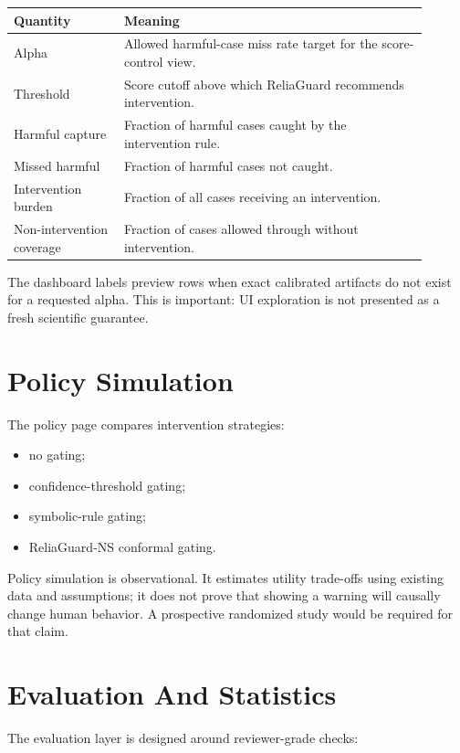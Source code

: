 \documentclass[11pt]{article}
\newcommand{\model}{ReliaGuard-NS}
\begin{document}
\begin{longtable}{p{0.24\linewidth} p{0.66\linewidth}}
\toprule
\textbf{Quantity} & \textbf{Meaning} \\
\midrule
Alpha & Allowed harmful-case miss rate target for the score-control view. \\
Threshold & Score cutoff above which ReliaGuard recommends intervention. \\
Harmful capture & Fraction of harmful cases caught by the intervention rule. \\
Missed harmful & Fraction of harmful cases not caught. \\
Intervention burden & Fraction of all cases receiving an intervention. \\
Non-intervention coverage & Fraction of cases allowed through without intervention. \\
\bottomrule
\end{longtable}

The dashboard labels preview rows when exact calibrated artifacts do not exist for a requested alpha. This is important: UI exploration is not presented as a fresh scientific guarantee.

\section{Policy Simulation}

The policy page compares intervention strategies:

\begin{itemize}[leftmargin=*]
  \item no gating;
  \item confidence-threshold gating;
  \item symbolic-rule gating;
  \item \model{} conformal gating.
\end{itemize}

Policy simulation is observational. It estimates utility trade-offs using existing data and assumptions; it does not prove that showing a warning will causally change human behavior. A prospective randomized study would be required for that claim.

\section{Evaluation And Statistics}

The evaluation layer is designed around reviewer-grade checks:
\end{document}
